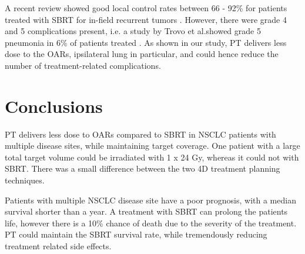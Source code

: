A recent review showed good local control rates between 66 - 92\% for patients treated with SBRT for in-field recurrent tumors \cite{Amini2014}. 
However, there were grade 4 and 5 complications present, i.e. a study by Trovo et al.showed grade 5 pneumonia in
6\% of patients treated \cite{Trovo2014}. As shown in our study, PT delivers less dose to the OARs, ipsilateral lung in particular, and could hence reduce the number of treatment-related
complications.

\section{Conclusions}

PT delivers less dose to OARs compared to SBRT in NSCLC patients with multiple disease sites, while maintaining target coverage. One patient with a large total target volume 
could be irradiated with 1 x 24 Gy, whereas it could not with SBRT. 
There was a small difference between the two 4D treatment planning techniques.

Patients with multiple NSCLC disease site have a poor prognosis, with a median survival shorter than a year. 
A treatment with SBRT can prolong the patients life, however there is a 10\% chance of death due to the severity of the treatment. PT could
maintain the SBRT survival rate, while tremendously reducing treatment related side effects.